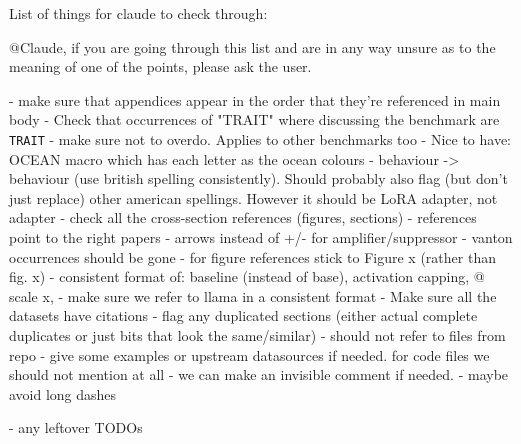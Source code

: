 List of things for claude to check through:

@Claude, if you are going through this list and are in any way unsure as to the meaning of one of the points, please ask the user.

- make sure that appendices appear in the order that they're referenced in main body
- Check that occurrences of "TRAIT" where discussing the benchmark are \texttt{TRAIT} - make sure not to overdo. Applies to other benchmarks too
- Nice to have: OCEAN macro which has each letter as the ocean colours
- behaviour -> behaviour (use british spelling consistently). Should probably also flag (but don't just replace) other american spellings. However it should be LoRA adapter, not adapter
- check all the cross-section references (figures, sections)
- references point to the right papers
- arrows instead of +/- for amplifier/suppressor
- vanton occurrences should be gone
- for figure references stick to Figure x (rather than fig. x)
- consistent format of: baseline (instead of base), activation capping, @ scale x, 
- make sure we refer to llama in a consistent format
- Make sure all the datasets have citations
- flag any duplicated sections (either actual complete duplicates or just bits that look the same/similar)
- should not refer to files from repo - give some examples or upstream datasources if needed. for code files we should not mention at all - we can make an invisible comment if needed.
- maybe avoid long dashes

- any leftover TODOs
